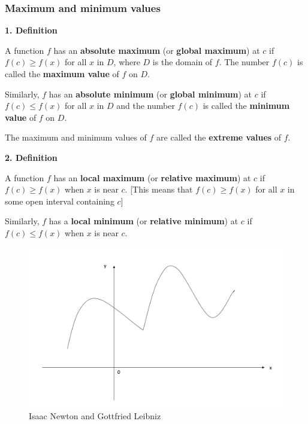 \documentclass[]{book}
\begin{document}
\hypertarget{maximum-and-minimum-values}{%
\subsubsection{Maximum and minimum values}\label{maximum-and-minimum-values}}

\textbf{1. Definition}

A function \(f\) has an \textbf{absolute maximum} (or \textbf{global maximum}) at \(c\) if \(f(c)\geq f(x)\) for all \(x\) in \(D\), where \(D\) is the domain of \(f\). The number \(f(c)\) is called the \textbf{maximum value} of \(f\) on \(D\).

Similarly, \(f\) has an \textbf{absolute minimum} (or \textbf{global minimum}) at \(c\) if \(f(c)\leq f(x)\) for all \(x\) in \(D\) and the number \(f(c)\) is called the \textbf{minimum value} of \(f\) on \(D\).

The maximum and minimum values of \(f\) are called the \textbf{extreme values} of \(f\).

\textbf{2. Definition}

A function \(f\) has an \textbf{local maximum} (or \textbf{relative maximum}) at \(c\) if \(f(c)\geq f(x)\) when \(x\) is near \(c\).
{[}This means that \(f(c)\geq f(x)\) for all \(x\) in some open interval containing \(c\){]}

Similarly, \(f\) has a \textbf{local minimum} (or \textbf{relative minimum}) at \(c\) if \(f(c)\leq f(x)\) when \(x\) is near \(c\).

\begin{figure}

{\centering \includegraphics[width=1\linewidth]{figure/5Derivatives-14} 

}

\caption{Isaac Newton and Gottfried Leibniz}\label{fig:unnamed-chunk-13}
\end{figure}
\end{document}
